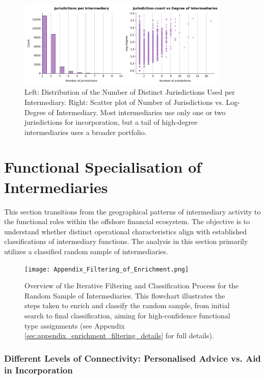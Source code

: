 \begin{figure}[htbp]
    \centering
    \includegraphics[width=0.9\textwidth]{images/Geography_Distribution_of_Jurisdictions_by_Intermediary.png} %
    \caption{Left: Distribution of the Number of Distinct Jurisdictions Used per Intermediary. Right: Scatter plot of Number of Jurisdictions vs. Log-Degree of Intermediary. Most intermediaries use only one or two jurisdictions for incorporation, but a tail of high-degree intermediaries uses a broader portfolio.}
    \label{fig:geography_distribution_jurisdictions_by_intermediary}
\end{figure}


\section{Functional Specialisation of Intermediaries}
\label{sec:functional_specialisation}

This section transitions from the geographical patterns of intermediary activity to the functional roles within the offshore financial ecosystem. The objective is to understand whether distinct operational characteristics align with established classifications of intermediary functions.  The analysis in this section primarily utilizes a classified random sample of intermediaries. 

\begin{figure}[htbp]
    \centering
    \texttt{[image: Appendix\_Filtering\_of\_Enrichment.png]}
    \caption{Overview of the Iterative Filtering and Classification Process for the Random Sample of Intermediaries. This flowchart illustrates the steps taken to enrich and classify the random sample, from initial search to final classification, aiming for high-confidence functional type assignments (see Appendix \ref{sec:appendix_enrichment_filtering_details} for full details).}
    \label{fig:appendix_filtering_enrichment}
\end{figure}

\subsubsection{Different Levels of Connectivity: Personalised Advice vs. Aid in Incorporation}
\label{subsubsec:connectivity_functional}

